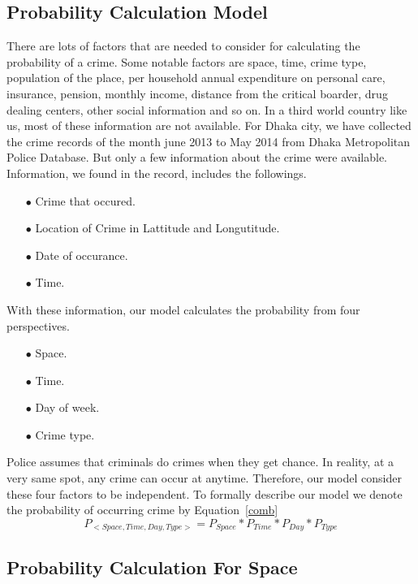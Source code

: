 \documentclass{sig-alternate}
\begin{document}
\subsection{Probability Calculation Model}
There are lots of factors that are needed to consider for calculating the probability of a crime. Some notable factors are space, time, crime type, population of the place, per household annual expenditure on personal care, insurance, pension, monthly income, distance from the critical boarder, drug dealing centers, other social information and so on. In a third world country like us, most of these information are not available. For Dhaka city, we have collected the crime records of the month june 2013 to May 2014 from Dhaka Metropolitan Police Database. But only a few information about the crime were available. Information, we found in the record, includes the followings.
\begin{enumerate}
\item[$\bullet$] {\sf Crime that occured.}
	\item[$\bullet$] {\sf Location of Crime in Lattitude and Longutitude.}
	\item[$\bullet$] {\sf Date of occurance.}
	\item[$\bullet$] {\sf Time.}
\end{enumerate}
With these information, our model calculates the probability from four perspectives.
\begin{enumerate}
\item[$\bullet$] {\sf Space.}
	\item[$\bullet$] {\sf Time.}
	\item[$\bullet$] {\sf Day of week.}
	\item[$\bullet$] {\sf Crime type.}
\end{enumerate}
Police assumes that criminals do crimes when they get chance. In reality, at a very same spot, any crime can occur at anytime. Therefore, our model consider these four factors to be independent. To formally describe our model we denote the probability of occurring crime by Equation~\ref{comb}
\begin{equation}
P_{<Space,Time,Day,Type>}=P_{Space}*P_{Time}*P_{Day}*P_{Type}
\label{comb}
\end{equation}



\subsection{Probability Calculation For Space}
\end{document}
